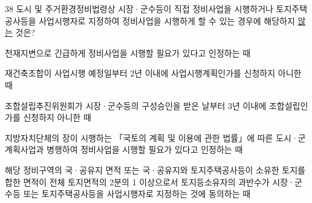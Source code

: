\begin{question}{38}
도시 및 주거환경정비법령상 시장·군수등이 직접 정비사업을 시행하거나 토지주택공사등을 사업시행자로 지정하여 정비사업을 시행하게 할 수 있는 경우에 해당하지 \uline{않는} 것은?
\begin{choices}
  \item 천재지변으로 긴급하게 정비사업을 시행할 필요가 있다고 인정하는 때
  \item 재건축조합이 사업시행 예정일부터 2년 이내에 사업시행계획인가를 신청하지 아니한 때
  \item 조합설립추진위원회가 시장·군수등의 구성승인을 받은 날부터 3년 이내에 조합설립인가를 신청하지 아니한 때
  \item 지방자치단체의 장이 시행하는 「국토의 계획 및 이용에 관한 법률」에 따른 도시·군계획사업과 병행하여 정비사업을 시행할 필요가 있다고 인정하는 때
  \item 해당 정비구역의 국·공유지 면적 또는 국·공유지와 토지주택공사등이 소유한 토지를 합한 면적이 전체 토지면적의 2분의 1 이상으로서 토지등소유자의 과반수가 시장·군수등 또는 토지주택공사등을 사업시행자로 지정하는 것에 동의하는 때
\end{choices}
\end{question}
